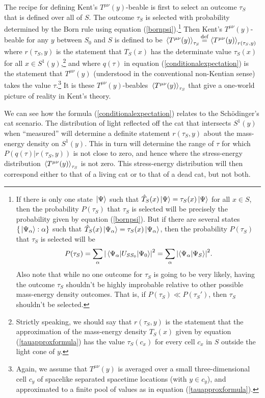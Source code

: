 The recipe for defining Kent's $T^{\mu\nu}(y)$-beable is first to select an outcome $\tau_S$ that is defined over all of $S$. The outcome $\tau_S$ is selected with probability determined by the Born rule using equation (\ref{bornpsi}).\footnote{If there is only one state $\ket*{\Psi}$ such that $\hat{T}_S(x)\ket*{\Psi}=\tau_S(x)\ket*{\Psi}$ for all $x\in S$, then the probability $P(\tau_S)$ that $\tau_S$ is selected will be precisely the probability given by equation (\ref{bornpsi}). But if there are several states $\{\ket*{\Psi_\alpha}:\alpha\}$ such that  $\hat{T}_S(x)\ket*{\Psi_\alpha}=\tau_S(x)\ket*{\Psi_\alpha}$, then the probability $P(\tau_S)$ that $\tau_S$ is selected will be 
$$P(\tau_S)=\sum_\alpha \abs{\mel{\Psi_\alpha}{U_{SS_0}}{\Psi_0}}^2=\sum_\alpha \abs{\ip{\Psi_\alpha}{\Psi_S}}^2.$$ 
Also note that while no one outcome for $\tau_S$ is going to be very likely, having the outcome $\tau_S$ shouldn't be highly improbable relative to other possible mass-energy density outcomes. That is, if $P(\tau_S)\ll P(\tau_S')$, then $\tau_S$ shouldn't be selected.} Then Kent's $T^{\mu\nu}(y)$-beable for any $y$ between $S_0$ and $S$ is defined to be $\ev*{T^{\mu\nu}(y)}_{\tau_S}\myeq \ev*{T^{\mu\nu}(y)}_{r(\tau_S,y)}$\label{Kentbeable} where $r(\tau_S, y)$ is the statement that $T_S(x)$ has the determinate value $\tau_S(x)$ for all $x\in S^1(y)$,\footnote{Strictly speaking, we should say that $r(\tau_S, y)$ is the statement that the approximation of the mass-energy density $T_S(x)$ given by equation (\ref{tauapproxformula}) has the value $\tau_S(c_x)$ for every cell $c_x$ in $S$ outside the light cone of $y$.} and where $q(\tau)$ in equation (\ref{conditionalexpectation}) is the statement that $T^{\mu\nu}(y)$ (understood in the conventional non-Kentian sense) takes the value $\tau$.\footnote{\label{cyfootnote}Again, we assume that $T^{\mu\nu}(y)$ is averaged over a small three-dimensional cell $c_y$ of spacelike separated spacetime locations (with $y\in c_y$), and approximated to a finite pool of values as in equation  (\ref{tauapproxformula}).} It is these $T^{\mu\nu}(y)$-beables $\ev*{T^{\mu\nu}(y)}_{\tau_S}$ that give a one-world picture of reality in Kent's theory. 

We can see how the formula (\ref{conditionalexpectation}) relates to the Sch\"{o}dinger's cat scenario. The distribution of light reflected off the cat that intersects $S^1(y)$ when ``measured'' will determine a definite statement $r(\tau_S, y)$ about the mass-energy density on $S^1(y)$. This in turn will determine the range of $\tau$ for which $P(q(\tau)|r(\tau_S,y))$ is not close to zero, and hence where the stress-energy distribution $\ev*{T^{\mu\nu}(y)}_{\tau_S}$ is not zero. This stress-energy distribution will then correspond either to that of  a living cat or to that of a dead cat, but not both.  

